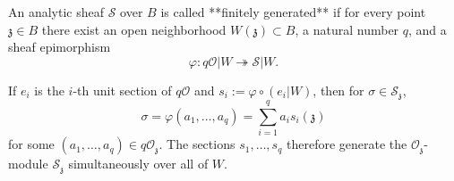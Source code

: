 An analytic sheaf $\mathcal{S}$ over $B$ is called **finitely generated** if for every point $\mathfrak{z} \in B$ there exist an open neighborhood $W(\mathfrak{z}) \subset B$, a natural number $q$, and a sheaf epimorphism
$$
\varphi: q\mathcal{O}|W \twoheadrightarrow \mathcal{S}|W.
$$

If $e_i$ is the $i$-th unit section of $q\mathcal{O}$ and $s_i := \varphi \circ (e_i|W)$, then for $\sigma \in \mathcal{S}_{\mathfrak{z}}$,
$$
\sigma = \varphi(a_1, \ldots, a_q) = \sum_{i=1}^{q} a_i s_i(\mathfrak{z})
$$
for some $(a_1, \ldots, a_q) \in q\mathcal{O}_{\mathfrak{z}}$. The sections $s_1, \ldots, s_q$ therefore generate the $\mathcal{O}_{\mathfrak{z}}$-module $\mathcal{S}_{\mathfrak{z}}$ simultaneously over all of $W$.
